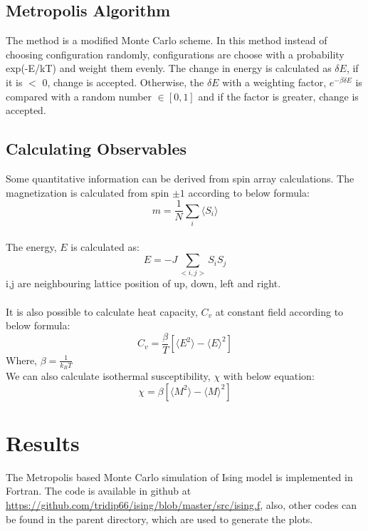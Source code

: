 \documentclass[]{article}
\begin{document}
\subsection{Metropolis Algorithm}
The method is a modified Monte Carlo scheme. In this method instead of choosing configuration randomly, configurations are choose with a probability exp(-E/kT) and weight them evenly.
The change in energy is calculated as $\delta E$, if it is $<$ 0, change is accepted. Otherwise, the $\delta E$ with a weighting factor, $e^{-\beta \delta E}$ is compared with a random number $\in [0,1] $ and if the factor is greater, change is accepted.
\\
\subsection{Calculating Observables}
Some quantitative information can be derived from spin array calculations. The magnetization is calculated from spin $\pm 1$ according to below formula:
\begin{equation} 
  m = \frac{1}{N}\sum_{i} \langle S_i \rangle
\end{equation}
\\
The energy, $E$ is calculated as:
\begin{equation} 
  E = - J \sum_{<i,j>} S_i S_j
\end{equation}
i,j are neighbouring lattice position of up, down, left and right.\\
\\
It is also possible to calculate heat capacity, $C_v$ at constant field according to below formula:
\begin{equation} 
  C_v = \frac{\beta}{T}[\langle E^2 \rangle - \langle E \rangle ^2]
\end{equation}
Where, $\beta = \frac{1}{k_B T}$ \\

We can also calculate isothermal susceptibility, $\chi$ with below equation:
\begin{equation} 
  \chi = \beta[\langle M^2 \rangle - \langle M \rangle ^2]
\end{equation}

\section{Results}
The Metropolis based Monte Carlo simulation of Ising model is implemented in Fortran. The code is available in github at \url{https://github.com/tridip66/ising/blob/master/src/ising.f}, also, other codes can be found in the parent directory, which are used 
to generate the plots.
\end{document}

